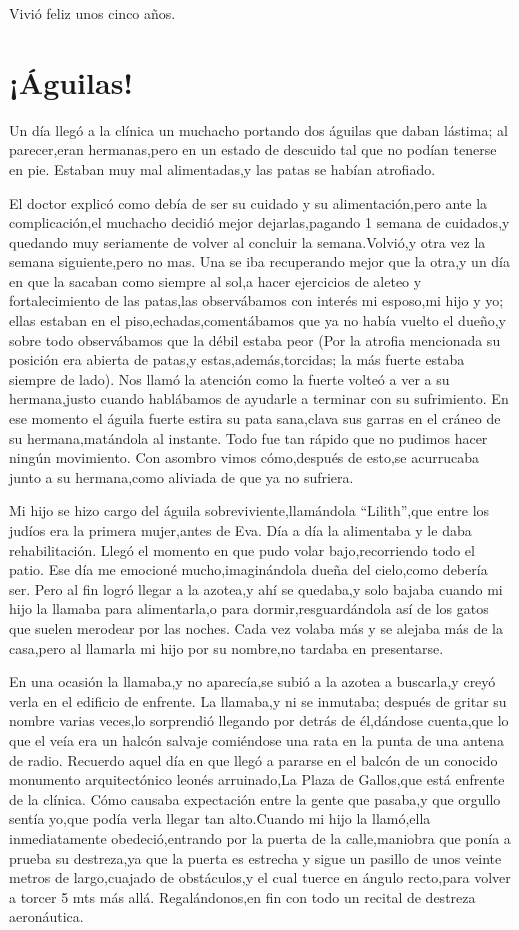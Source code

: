 \documentclass[letterpaper,12pt]{book}
\begin{document}
Vivió feliz unos cinco años.


\chapter{¡Águilas!}
Un día llegó a la clínica un muchacho portando dos águilas que daban lástima; al parecer,eran hermanas,pero en un estado de descuido tal que no podían tenerse en pie. Estaban muy mal alimentadas,y las patas se habían atrofiado.

El doctor explicó como debía de ser su cuidado y su alimentación,pero ante la complicación,el muchacho decidió mejor dejarlas,pagando 1 semana de cuidados,y quedando muy seriamente de volver al concluir la semana.Volvió,y otra vez la semana siguiente,pero no mas. Una se iba recuperando mejor que la otra,y un día en que la sacaban como siempre al sol,a hacer ejercicios de aleteo y fortalecimiento de las patas,las observábamos con interés mi esposo,mi hijo y yo; ellas estaban en el piso,echadas,comentábamos que ya no había vuelto el dueño,y sobre todo observábamos que la débil estaba peor (Por la atrofia mencionada su posición era abierta de patas,y estas,además,torcidas; la más fuerte estaba siempre de lado). Nos llamó la  atención como la fuerte volteó a ver a su hermana,justo cuando hablábamos de ayudarle a terminar con su sufrimiento. En ese momento el águila fuerte estira su pata sana,clava sus garras en el cráneo de su hermana,matándola al instante. Todo fue tan rápido que no pudimos hacer ningún movimiento. Con asombro vimos cómo,después de esto,se acurrucaba junto a su hermana,como aliviada de que ya no sufriera.

Mi hijo se hizo cargo del águila sobreviviente,llamándola ``Lilith'',que entre los judíos era la primera mujer,antes de Eva. Día a día la alimentaba y le daba rehabilitación. Llegó el momento en que pudo volar bajo,recorriendo todo el patio. Ese día me emocioné mucho,imaginándola dueña del cielo,como debería ser. Pero al fin logró llegar a la azotea,y ahí se quedaba,y solo bajaba cuando mi hijo la llamaba para alimentarla,o para dormir,resguardándola así de los gatos que suelen merodear por las noches. Cada vez volaba más y se alejaba más de la casa,pero al llamarla mi hijo por su nombre,no tardaba en presentarse.

En una ocasión la llamaba,y no aparecía,se subió a la azotea a buscarla,y creyó verla en el edificio de enfrente. La llamaba,y ni se inmutaba; después de gritar su nombre varias veces,lo sorprendió llegando por detrás de él,dándose cuenta,que lo que el veía era un halcón salvaje comiéndose una rata en la punta de una antena de radio. Recuerdo aquel día en que llegó a pararse en el balcón de un conocido monumento arquitectónico leonés arruinado,La Plaza de Gallos,que está enfrente de la clínica. Cómo causaba expectación entre la gente que pasaba,y que orgullo sentía yo,que podía verla llegar tan alto.Cuando mi hijo la llamó,ella inmediatamente obedeció,entrando por la puerta de la calle,maniobra que ponía a prueba su destreza,ya que la puerta es estrecha y sigue un pasillo de unos veinte metros de largo,cuajado de obstáculos,y el cual tuerce en ángulo recto,para volver a torcer 5 mts más allá. Regalándonos,en fin con todo un recital de destreza aeronáutica.
\end{document}
